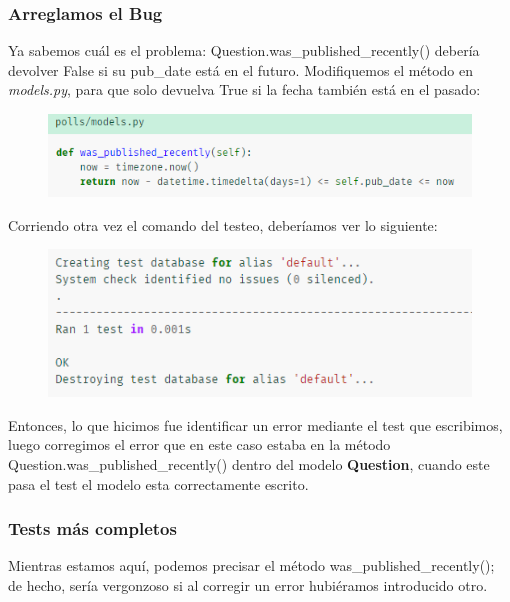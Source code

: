 \documentclass[10pt]{article}
\begin{document}
\subsubsection{Arreglamos el Bug}
Ya sabemos cuál es el problema: \textcolor{G}{Question.was\_published\_recently()} debería devolver \textcolor{R}{False} si su \textcolor{G}{pub\_date} está en el futuro. Modifiquemos el método en \textit{models.py}, para que solo devuelva True si la fecha también está en el pasado:
\begin{figure}[H]
\begin{center}
\includegraphics[scale=1]{figuras/3/35/355/img1.png}
\end{center}
\end{figure}
Corriendo otra vez el comando del testeo, deberíamos ver lo siguiente:
\begin{figure}[H]
\begin{center}
\includegraphics[scale=1]{figuras/3/35/355/img2.png}
\end{center}
\end{figure}
Entonces, lo que hicimos fue identificar un error mediante el test que escribimos, luego corregimos el error que en este caso estaba en la método \textcolor{G}{Question.was\_published\_recently()} dentro del modelo \textbf{Question}, cuando este pasa el test el modelo esta correctamente escrito.

\subsubsection{Tests más completos}
Mientras estamos aquí, podemos precisar el método \textcolor{G}{was\_published\_recently()}; de hecho, sería vergonzoso si al corregir un error hubiéramos introducido otro.
\end{document}
